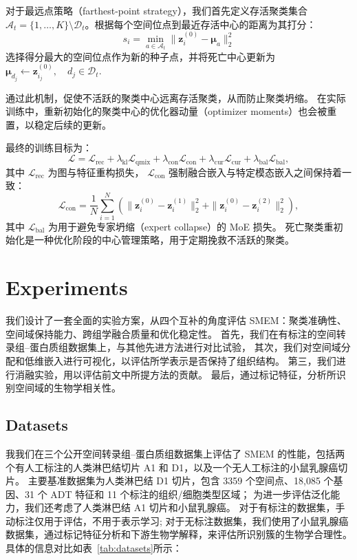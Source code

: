 \documentclass[journal]{IEEEtran}
\begin{document}
对于最远点策略（farthest-point strategy），我们首先定义存活聚类集合 $\mathcal{A}_t=\{1,\ldots,K\}\setminus\mathcal{D}_t$。根据每个空间位点到最近存活中心的距离为其打分：
\begin{equation}
s_i
=
\min_{a\in\mathcal{A}_t}
\|\mathbf{z}_{i}^{(0)}-\boldsymbol{\mu}_{a}\|_2^2
\end{equation}
选择得分最大的空间位点作为新的种子点，并将死亡中心更新为$\boldsymbol{\mu}_{d_j}
\leftarrow
\mathbf{z}_{i_j}^{(0)},
\quad
d_j\in\mathcal{D}_t.$

通过此机制，促使不活跃的聚类中心远离存活聚类，从而防止聚类坍缩。
在实际训练中，重新初始化的聚类中心的优化器动量（optimizer moments）也会被重置，以稳定后续的更新。

最终的训练目标为：$$\mathcal{L}
=
\mathcal{L}_{\mathrm{rec}}
+
\lambda_{\mathrm{kl}}\mathcal{L}_{\mathrm{qmix}}
+
\lambda_{\mathrm{con}}\mathcal{L}_{\mathrm{con}}
+
\lambda_{\mathrm{cur}}\mathcal{L}_{\mathrm{cur}}
+
\lambda_{\mathrm{bal}}\mathcal{L}_{\mathrm{bal}},$$其中 $\mathcal{L}_{\mathrm{rec}}$ 为图与特征重构损失，
$\mathcal{L}_{\mathrm{con}}$ 强制融合嵌入与特定模态嵌入之间保持着一致：$$\mathcal{L}_{\mathrm{con}}
=
\frac{1}{N}
\sum_{i=1}^{N}
\left(
\|\mathbf{z}_{i}^{(0)}-\mathbf{z}_{i}^{(1)}\|_2^2
+
\|\mathbf{z}_{i}^{(0)}-\mathbf{z}_{i}^{(2)}\|_2^2
\right),$$其中 $\mathcal{L}_{\mathrm{bal}}$ 为用于避免专家坍缩（expert collapse）的 MoE 损失。
死亡聚类重初始化是一种优化阶段的中心管理策略，用于定期挽救不活跃的聚类。



\section{Experiments}
我们设计了一套全面的实验方案，从四个互补的角度评估 SMEM：聚类准确性、空间域保持能力、跨组学融合质量和优化稳定性。
首先，我们在有标注的空间转录组–蛋白质组数据集上，与其他先进方法进行对比试验，
其次，我们对空间域分配和低维嵌入进行可视化，以评估所学表示是否保持了组织结构。
第三，我们进行消融实验，用以评估前文中所提方法的贡献。
最后，通过标记特征，分析所识别空间域的生物学相关性。

\subsection{Datasets}
我我们在三个公开空间转录组–蛋白质组数据集上评估了 SMEM 的性能，包括两个有人工标注的人类淋巴结切片 A1 和 D1，以及一个无人工标注的小鼠乳腺癌切片。
主要基准数据集为人类淋巴结 D1 切片，包含 3359 个空间点、18,085 个基因、31 个 ADT 特征和 11 个标注的组织/细胞类型区域；
为进一步评估泛化能力，我们还考虑了人类淋巴结 A1 切片和小鼠乳腺癌。
对于有标注的数据集，手动标注仅用于评估，不用于表示学习;
对于无标注数据集，我们使用了小鼠乳腺癌数据集，通过标记特征分析和下游生物学解释，来评估所识别簇的生物学合理性。
具体的信息对比如表~\ref{tab:datasets}所示：
\end{document}
